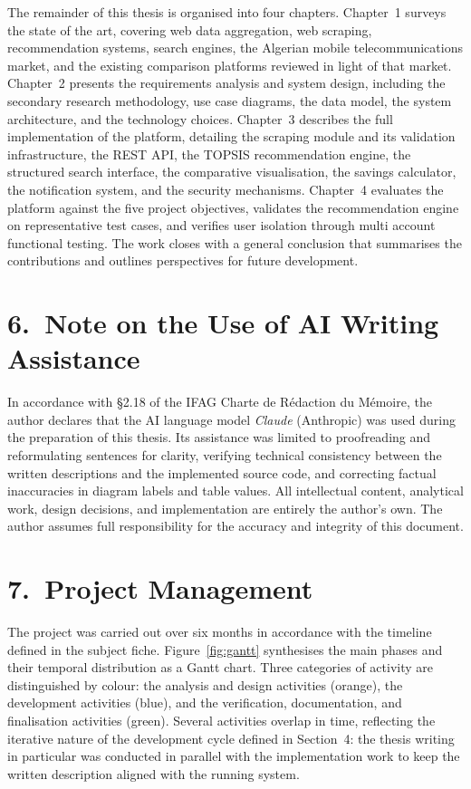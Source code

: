 The remainder of this thesis is organised into four chapters. Chapter~1 surveys the state of the art, covering web data aggregation, web scraping, recommendation systems, search engines, the Algerian mobile telecommunications market, and the existing comparison platforms reviewed in light of that market. Chapter~2 presents the requirements analysis and system design, including the secondary research methodology, use case diagrams, the data model, the system architecture, and the technology choices. Chapter~3 describes the full implementation of the platform, detailing the scraping module and its validation infrastructure, the REST API, the TOPSIS recommendation engine, the structured search interface, the comparative visualisation, the savings calculator, the notification system, and the security mechanisms. Chapter~4 evaluates the platform against the five project objectives, validates the recommendation engine on representative test cases, and verifies user isolation through multi account functional testing. The work closes with a general conclusion that summarises the contributions and outlines perspectives for future development.

\section*{6.~Note on the Use of AI Writing Assistance}

In accordance with \S{}2.18 of the IFAG Charte de Rédaction du Mémoire, the author declares that the AI language model \textit{Claude} (Anthropic) was used during the preparation of this thesis. Its assistance was limited to proofreading and reformulating sentences for clarity, verifying technical consistency between the written descriptions and the implemented source code, and correcting factual inaccuracies in diagram labels and table values. All intellectual content, analytical work, design decisions, and implementation are entirely the author's own. The author assumes full responsibility for the accuracy and integrity of this document.

\section*{7.~Project Management}

The project was carried out over six months in accordance with the timeline defined in the subject fiche. Figure~\ref{fig:gantt} synthesises the main phases and their temporal distribution as a Gantt chart. Three categories of activity are distinguished by colour: the analysis and design activities (orange), the development activities (blue), and the verification, documentation, and finalisation activities (green). Several activities overlap in time, reflecting the iterative nature of the development cycle defined in Section~4: the thesis writing in particular was conducted in parallel with the implementation work to keep the written description aligned with the running system.

